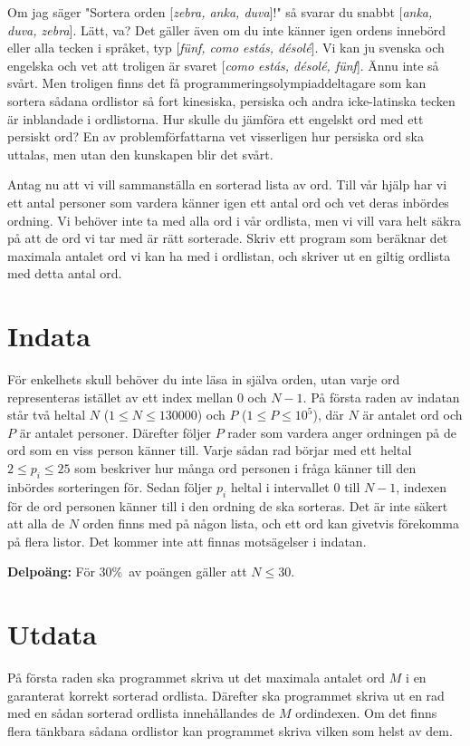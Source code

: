 
Om jag säger "Sortera orden [\emph{zebra, anka, duva}]!" så svarar du snabbt [\emph{anka, duva, zebra}]. Lätt, va? Det gäller även om du inte känner igen ordens innebörd eller alla tecken i språket, typ [\emph{fünf, como estás, désolé}]. Vi kan ju svenska och engelska och vet att troligen är svaret [\emph{como estás, désolé, fünf}]. Ännu inte så svårt. Men troligen finns det få programmeringsolympiaddeltagare som kan sortera sådana ordlistor så fort kinesiska, persiska och andra icke-latinska tecken är inblandade i ordlistorna. Hur skulle du jämföra ett engelskt ord med ett persiskt ord? En av problemförfattarna vet visserligen hur persiska ord ska uttalas, men utan den kunskapen blir det svårt.


Antag nu att vi vill sammanställa en sorterad lista av ord. Till vår hjälp har vi ett antal personer som vardera känner igen ett antal ord och vet deras inbördes ordning. Vi behöver inte ta med alla ord i vår ordlista, men vi vill vara helt säkra på att de ord vi tar med är rätt sorterade. Skriv ett program som beräknar det maximala antalet ord vi kan ha med i ordlistan, och skriver ut en giltig ordlista med detta antal ord.

\section*{Indata}
För enkelhets skull behöver du inte läsa in själva orden, utan varje ord representeras istället av ett index mellan $0$ och $N-1$. På första raden av indatan står två heltal $N$ ($1 \leq N \leq 130000$) och $P$ ($1 \leq P \leq 10^5$), där $N$ är antalet ord och $P$ är antalet personer. Därefter följer $P$ rader som vardera anger ordningen på de ord som en viss person känner till. Varje sådan rad börjar med ett heltal $2 \leq p_i \leq 25$ som beskriver hur många ord personen i fråga känner till den inbördes sorteringen för. Sedan följer $p_i$ heltal i intervallet $0$ till $N-1$, indexen för de ord personen känner till i den ordning de ska sorteras. Det är inte säkert att alla de $N$ orden finns med på någon lista, och ett ord kan givetvis förekomma på flera listor. Det kommer inte att finnas motsägelser i indatan.

{\bf Delpoäng:} För 30\%\ av poängen gäller att $N \le 30$.

\section*{Utdata}
På första raden ska programmet skriva ut det maximala antalet ord $M$ i en garanterat korrekt sorterad ordlista. Därefter ska programmet skriva ut en rad med en sådan sorterad ordlista innehållandes de $M$ ordindexen. Om det finns flera tänkbara sådana ordlistor kan programmet skriva vilken som helst av dem.
